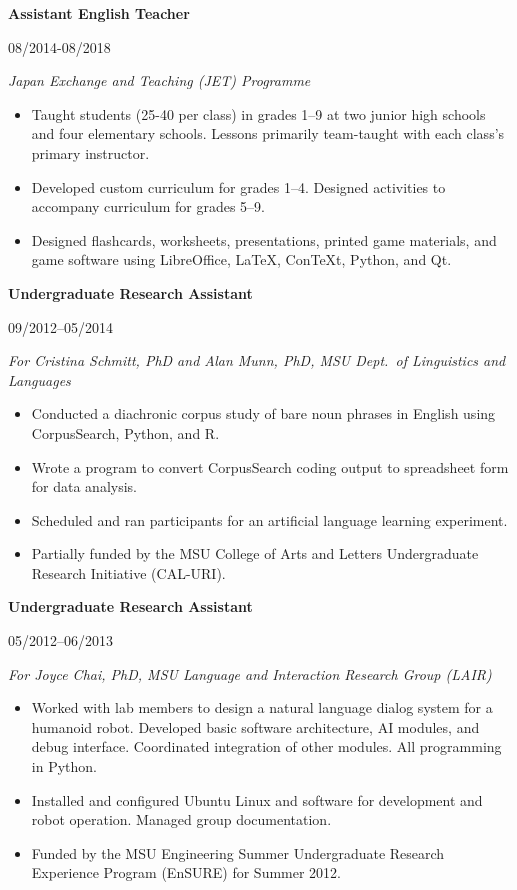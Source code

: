 \documentclass[10pt,oneside]{article}
\newcommand{\resbigitem}[4]{
	\item \parbox[t]{0.8\textwidth}{\textbf{#1}} \hfill #2 \\
		\parbox[t]{0.8\textwidth}{\textit{#3}} \hfill \textit{#4}
}
\begin{document}
\begin{reslist}
	\resbigitem{Assistant English Teacher}
		{08/2014-08/2018}
		{Japan Exchange and Teaching (JET) Programme}
		{}
	\begin{itemize}
		\item Taught students (25-40 per class) in grades 1--9 at two junior high schools and four elementary schools. Lessons primarily team-taught with each class's primary instructor.
		\item Developed custom curriculum for grades 1--4. Designed activities to accompany curriculum for grades 5--9.
		\item Designed flashcards, worksheets, presentations, printed game materials, and game software using LibreOffice, LaTeX, ConTeXt, Python, and Qt.
	\end{itemize}

	\resbigitem{Undergraduate Research Assistant}
		{09/2012--05/2014}
		{For Cristina Schmitt, PhD and Alan Munn, PhD, MSU Dept.\ of Linguistics and Languages}
		{}
	\begin{itemize}
		\item Conducted a diachronic corpus study of bare noun phrases in English using CorpusSearch, Python, and R.
		\item Wrote a program to convert CorpusSearch coding output to spreadsheet form for data analysis.
		\item Scheduled and ran participants for an artificial language learning experiment.
		\item Partially funded by the MSU College of Arts and Letters Undergraduate Research Initiative (CAL-URI).
	\end{itemize}
	
	\resbigitem{Undergraduate Research Assistant}
		{05/2012--06/2013}
		{For Joyce Chai, PhD, MSU Language and Interaction Research Group (LAIR)}
		{}
	\begin{itemize}
		\item Worked with lab members to design a natural language dialog system for a humanoid robot. Developed basic software architecture, AI modules, and debug interface. Coordinated integration of other modules. All programming in Python.
		\item Installed and configured Ubuntu Linux and software for development and robot operation. Managed group documentation.
		\item Funded by the MSU Engineering Summer Undergraduate Research Experience Program (EnSURE) for Summer 2012.
	\end{itemize}
	

\end{reslist}
\end{document}
